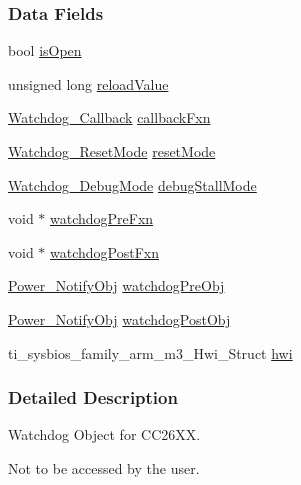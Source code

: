 \subsubsection*{Data Fields}
\begin{DoxyCompactItemize}
\item 
bool \hyperlink{struct_watchdog_c_c26_x_x___object_a841c8d0d31d1579a93b252a1fa0f24ee}{is\+Open}
\item 
unsigned long \hyperlink{struct_watchdog_c_c26_x_x___object_ab52a49d15bf7f8a977a173557f065513}{reload\+Value}
\item 
\hyperlink{_watchdog_8h_abb9d5f385013e9950884200d8d05fd05}{Watchdog\+\_\+\+Callback} \hyperlink{struct_watchdog_c_c26_x_x___object_aa6c9f831aad4ab34f61bf323aa3c0b51}{callback\+Fxn}
\item 
\hyperlink{_watchdog_8h_ada0db7216129d7dad494bb0cd0169f88}{Watchdog\+\_\+\+Reset\+Mode} \hyperlink{struct_watchdog_c_c26_x_x___object_a6d5b931599fbf0753e7cba317d638385}{reset\+Mode}
\item 
\hyperlink{_watchdog_8h_ab1aa5862661c88a16b9d7bc12709d51e}{Watchdog\+\_\+\+Debug\+Mode} \hyperlink{struct_watchdog_c_c26_x_x___object_a1d7fd3a5482cda6047764bdd4d5c81e3}{debug\+Stall\+Mode}
\item 
void $\ast$ \hyperlink{struct_watchdog_c_c26_x_x___object_ade43c12f9201eaff5a7a5d59ae0ce7c1}{watchdog\+Pre\+Fxn}
\item 
void $\ast$ \hyperlink{struct_watchdog_c_c26_x_x___object_a663b81191d1d54360173b15ad9598948}{watchdog\+Post\+Fxn}
\item 
\hyperlink{struct_power___notify_obj}{Power\+\_\+\+Notify\+Obj} \hyperlink{struct_watchdog_c_c26_x_x___object_a93d0a7f9f1de80b9e7873c57ad9c8d71}{watchdog\+Pre\+Obj}
\item 
\hyperlink{struct_power___notify_obj}{Power\+\_\+\+Notify\+Obj} \hyperlink{struct_watchdog_c_c26_x_x___object_aca086d9794c9fef4091969e76de0847c}{watchdog\+Post\+Obj}
\item 
ti\+\_\+sysbios\+\_\+family\+\_\+arm\+\_\+m3\+\_\+\+Hwi\+\_\+\+Struct \hyperlink{struct_watchdog_c_c26_x_x___object_ae678273b5e2e747dfb6a36bfca820f0a}{hwi}
\end{DoxyCompactItemize}


\subsubsection{Detailed Description}
Watchdog Object for C\+C26\+X\+X. 

Not to be accessed by the user. 

